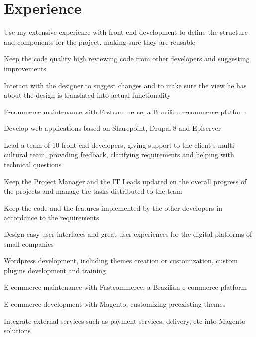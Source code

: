 \documentclass{resumecustom}%
\begin{document}
\section{Experience}%
%
%
%
\vspace{\topsep}%
\begin{tightemize}%
\item  Use my extensive experience with front end development to define the structure and components for the project, making sure they are reusable%
\item Keep the code quality high reviewing code from other developers and suggesting improvements%
\item  Interact with the designer to suggest changes and to make sure the view he has about the design is translated into actual functionality%
\item  E-commerce maintenance with Fastcommerce, a Brazilian e-commerce platform%
\end{tightemize}%
\sectionsep%
%
%
%
\vspace{\topsep}%
\begin{tightemize}%
\item Develop web applications based on Sharepoint, Drupal 8 and Episerver%
\item Lead a team of 10 front end developers, giving support to the client's multi-cultural team, providing feedback, clarifying requirements and helping with technical questions%
\item Keep the Project Manager and the IT Leads updated on the overall progress of the projects and manage the tasks distributed to the team%
\item Keep the code and the features implemented by the other developers in accordance to the requirements%
\end{tightemize}%
\sectionsep%
%
%
%
\vspace{\topsep}%
\begin{tightemize}%
\item Design easy user interfaces and great user experiences for the digital platforms of small companies%
\item Wordpress development, including themes creation or customization, custom plugins development and training%
\item E-commerce maintenance with Fastcommerce, a Brazilian e-commerce platform%
\item E-commerce development with Magento, customizing preexisting themes%
\item Integrate external services such as payment services, delivery, etc into Magento solutions%
\end{tightemize}%
\sectionsep%
\end{document}

